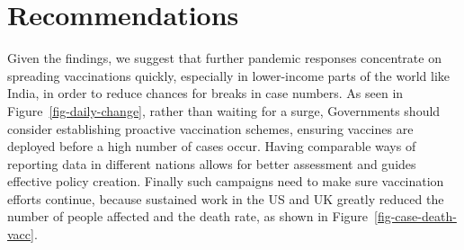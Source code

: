 \documentclass[
  11pt,
]{article}
\begin{document}
\section{Recommendations}\label{sec-recommendations}

Given the findings, we suggest that further pandemic responses
concentrate on spreading vaccinations quickly, especially in
lower-income parts of the world like India, in order to reduce chances
for breaks in case numbers. As seen in Figure~\ref{fig-daily-change},
rather than waiting for a surge, Governments should consider
establishing proactive vaccination schemes, ensuring vaccines are
deployed before a high number of cases occur. Having comparable ways of
reporting data in different nations allows for better assessment and
guides effective policy creation. Finally such campaigns need to make
sure vaccination efforts continue, because sustained work in the US and
UK greatly reduced the number of people affected and the death rate, as
shown in Figure~\ref{fig-case-death-vacc}.
\end{document}
